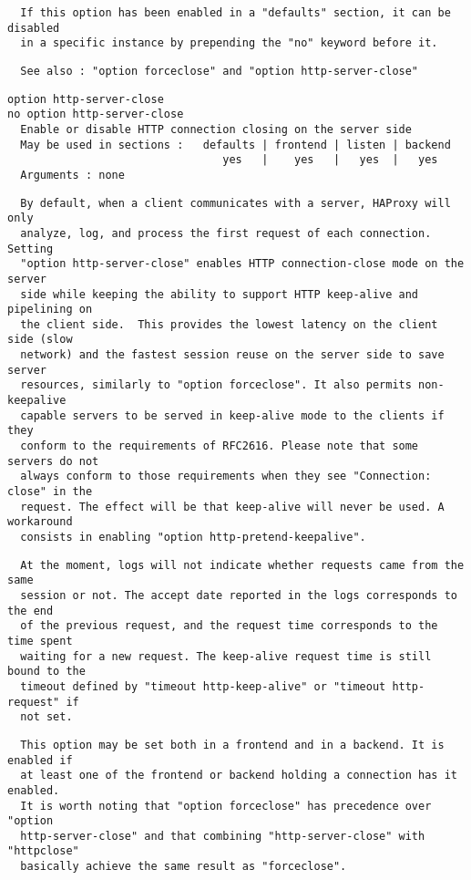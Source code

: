 \begin{verbatim}
  If this option has been enabled in a "defaults" section, it can be disabled
  in a specific instance by prepending the "no" keyword before it.
\end{verbatim}

\begin{verbatim}
  See also : "option forceclose" and "option http-server-close"
\end{verbatim}

\begin{verbatim}
option http-server-close
no option http-server-close
  Enable or disable HTTP connection closing on the server side
  May be used in sections :   defaults | frontend | listen | backend
                                 yes   |    yes   |   yes  |   yes
  Arguments : none
\end{verbatim}

\begin{verbatim}
  By default, when a client communicates with a server, HAProxy will only
  analyze, log, and process the first request of each connection. Setting
  "option http-server-close" enables HTTP connection-close mode on the server
  side while keeping the ability to support HTTP keep-alive and pipelining on
  the client side.  This provides the lowest latency on the client side (slow
  network) and the fastest session reuse on the server side to save server
  resources, similarly to "option forceclose". It also permits non-keepalive
  capable servers to be served in keep-alive mode to the clients if they
  conform to the requirements of RFC2616. Please note that some servers do not
  always conform to those requirements when they see "Connection: close" in the
  request. The effect will be that keep-alive will never be used. A workaround
  consists in enabling "option http-pretend-keepalive".
\end{verbatim}

\begin{verbatim}
  At the moment, logs will not indicate whether requests came from the same
  session or not. The accept date reported in the logs corresponds to the end
  of the previous request, and the request time corresponds to the time spent
  waiting for a new request. The keep-alive request time is still bound to the
  timeout defined by "timeout http-keep-alive" or "timeout http-request" if
  not set.
\end{verbatim}

\begin{verbatim}
  This option may be set both in a frontend and in a backend. It is enabled if
  at least one of the frontend or backend holding a connection has it enabled.
  It is worth noting that "option forceclose" has precedence over "option
  http-server-close" and that combining "http-server-close" with "httpclose"
  basically achieve the same result as "forceclose".
\end{verbatim}

